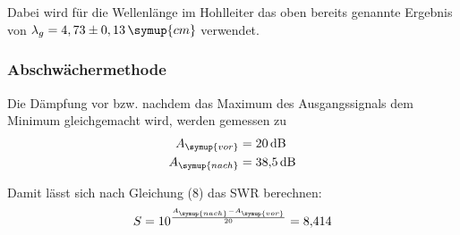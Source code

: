 Dabei wird für die Wellenlänge im Hohlleiter das oben bereits genannte Ergebnis von $\lambda_g = 4,73 \pm 0,13 \, \symup{cm}$ verwendet.

\subsubsection{Abschwächermethode}
Die Dämpfung vor bzw. nachdem das Maximum des Ausgangssignals dem Minimum
gleichgemacht wird, werden gemessen zu
\begin{align*}
  A_\symup{vor} &= \SI{20}{\decibel} \\
  A_\symup{nach} &= \SI{38.5}{\decibel}
\end{align*}

Damit lässt sich nach Gleichung (8) das SWR berechnen:
\begin{equation*}
  S = 10^{\frac{A_\symup{nach}-A_\symup{vor}}{20}} = \num{8,414}
\end{equation*}
